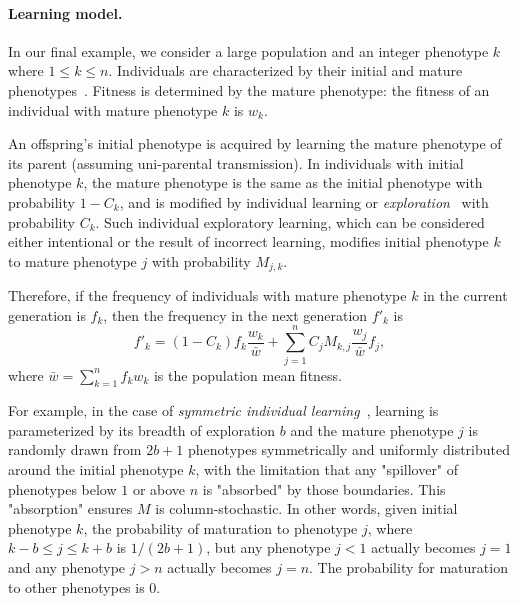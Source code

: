 \documentclass[12pt, twocolumn]{extarticle}
\begin{document}
\paragraph*{Learning model.}\label{sec:learn_model}

In our final example, we consider a large population and an integer phenotype $k$ where $1 \le k \le n$.
Individuals are characterized by their initial and mature phenotypes~\citep[pg.~94]{Boyd1988}.
Fitness is determined by the mature phenotype: the fitness of an individual with mature phenotype $k$ is $w_k$.

An offspring's initial phenotype is acquired by learning the mature phenotype of its parent (assuming uni-parental transmission).
In individuals with initial phenotype $k$, the mature phenotype is the same as the initial phenotype with probability $1-C_k$, and is modified by individual learning or \emph{exploration}~\citep{Borenstein2008} with probability $C_k$.
Such individual exploratory learning, which can be considered either intentional or the result of incorrect learning, modifies initial phenotype $k$ to mature phenotype $j$ with probability $M_{j,k}$.

Therefore, if the frequency of individuals with mature phenotype $k$ in the current generation is $f_k$, then the frequency in the next generation $f'_k$ is
\begin{equation}
f'_k = (1-C_k) f_k \frac{w_{k}}{\bar{w}} + \sum_{j=1}^{n}{C_j M_{k,j} \frac{w_{j}}{\bar{w}} f_j },
\end{equation}
where $\bar{w} = \sum_{k=1}^{n}{f_k w_{k}}$ is the population mean fitness.

For example, in the case of \emph{symmetric individual learning}~\citep{Borenstein2008}, learning is parameterized by its breadth of exploration $b$ and the mature phenotype $j$ is randomly drawn from $2b+1$ phenotypes symmetrically and uniformly distributed around the initial phenotype $k$, with the limitation that any "spillover" of phenotypes below $1$ or above $n$ is "absorbed" by those boundaries.
This "absorption" ensures $M$ is column-stochastic. 
In other words, given initial phenotype $k$, the probability of maturation to phenotype $j$, where $k-b \le j \le k+b$ is $1/(2b+1)$, but any phenotype $j<1$ actually becomes $j=1$ and any phenotype $j>n$ actually becomes $j=n$.
The probability for maturation to other phenotypes is $0$.
\end{document}
